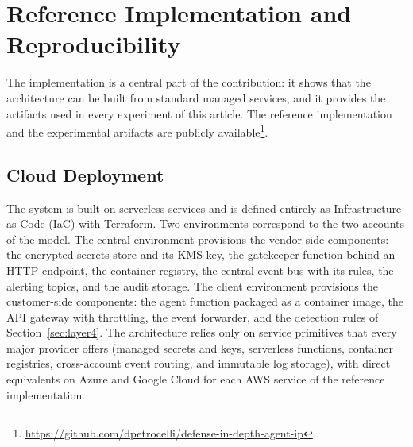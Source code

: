 \section{Reference Implementation and Reproducibility}
\label{sec:implementation}

The implementation is a central part of the contribution: it shows that the architecture can be built from standard managed services, and it provides the artifacts used in every experiment of this article. The reference implementation and the experimental artifacts are publicly available\footnote{\url{https://github.com/dpetrocelli/defense-in-depth-agent-ip}}.

\subsection{Cloud Deployment}

The system is built on serverless services and is defined entirely as Infrastructure-as-Code (IaC) with Terraform. Two environments correspond to the two accounts of the model. The central environment provisions the vendor-side components: the encrypted secrets store and its KMS key, the gatekeeper function behind an HTTP endpoint, the container registry, the central event bus with its rules, the alerting topics, and the audit storage. The client environment provisions the customer-side components: the agent function packaged as a container image, the API gateway with throttling, the event forwarder, and the detection rules of Section~\ref{sec:layer4}. The architecture relies only on service primitives that every major provider offers (managed secrets and keys, serverless functions, container registries, cross-account event routing, and immutable log storage), with direct equivalents on Azure and Google Cloud for each AWS service of the reference implementation.

